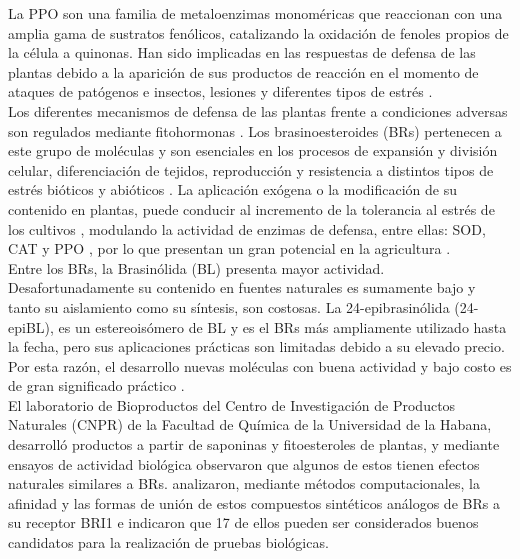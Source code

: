 La PPO son una familia de metaloenzimas monom\'ericas que reaccionan con una amplia gama de sustratos fen\'olicos, catalizando la oxidaci\'on de fenoles propios de la c\'elula a quinonas. Han sido implicadas en las respuestas de defensa de las plantas debido a la aparici\'on de sus productos de reacci\'on en el momento de ataques de pat\'ogenos e insectos, lesiones y diferentes tipos de estr\'es \citep{mayer1979polyphenol, constabel1995systemin, maki2006development}. \\

Los diferentes mecanismos de defensa de las plantas frente a condiciones adversas son regulados mediante fitohormonas \citep{verma2016plant}. Los brasinoesteroides (BRs) pertenecen a este grupo de mol\'eculas y son esenciales en los procesos de expansi\'on y divisi\'on celular, diferenciaci\'on de tejidos, reproducci\'on y resistencia a distintos tipos de estr\'es bi\'oticos y abi\'oticos \citep{belkhadir2006brassinosteroid}. La aplicaci\'on ex\'ogena o la modificaci\'on de su contenido en plantas, puede conducir al incremento de la tolerancia al estr\'es de los cultivos \citep{moreno2018silico}, modulando la actividad de enzimas de defensa, entre ellas: SOD, CAT y PPO \citep{fariduddin2014brassinosteroids}, por lo que presentan un gran potencial en la agricultura \citep{hernandez2016brasinoesteroides}.\\ 

Entre los BRs, la Brasin\'olida (BL) presenta mayor actividad. Desafortunadamente su contenido en fuentes naturales es sumamente bajo y tanto su aislamiento como su s\'intesis, son costosas. La 24-epibrasin\'olida (24-epiBL), es un estereois\'omero de BL y es el BRs m\'as ampliamente utilizado hasta la fecha, pero sus aplicaciones prácticas son limitadas debido a su elevado precio. Por esta raz\'on, el desarrollo nuevas moléculas con buena actividad y bajo costo es de gran significado práctico \citep{lei2017structure}.\\

El laboratorio de Bioproductos del Centro de Investigación de Productos Naturales (CNPR) de la Facultad de Química de la Universidad de la Habana, desarroll\'o productos a partir de saponinas y fitoesteroles de plantas, y mediante ensayos de actividad biológica observaron que algunos de estos tienen efectos naturales similares a BRs. \cite{moreno2018silico} analizaron, mediante m\'etodos computacionales, la afinidad y las formas de uni\'on de estos compuestos sint\'eticos an\'alogos de BRs a su receptor BRI1 e indicaron que 17 de ellos pueden ser considerados buenos candidatos para la realizaci\'on de pruebas biol\'ogicas. \\

